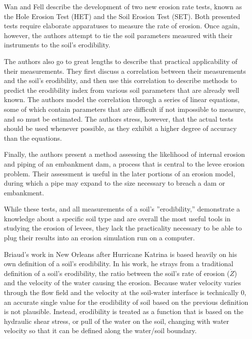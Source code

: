 Wan and Fell \cite{Wan-InvestigationOfErosionRate} describe the development of two new erosion rate tests, known as the Hole Erosion Test (HET) and the Soil Erosion Test (SET). Both presented tests require elaborate apparatuses to measure the rate of erosion. Once again, however, the authors attempt to tie the soil parameters measured with their instruments to the soil's erodibility.

The authors also go to great lengths to describe that practical applicability of their measurements. They first discuss a correlation between their measurements and the soil's erodibility, and then use this correlation to describe methods to predict the erodibility index from various soil parameters that are already well known. The authors model the correlation through a series of linear equations, some of which contain parameters that are difficult if not impossible to measure, and so must be estimated. The authors stress, however, that the actual tests should be used whenever possible, as they exhibit a higher degree of accuracy than the equations.

Finally, the authors present a method assessing the likelihood of internal erosion and piping of an embankment dam, a process that is central to the levee erosion problem. Their assessment is useful in the later portions of an erosion model, during which a pipe may expand to the size necessary to breach a dam or embankment.

While these tests, and all measurements of a soil's ''erodibility,'' demonstrate a knowledge about a specific soil type and are overall the most useful tools in studying the erosion of levees, they lack the practicality necessary to be able to plug their results into an erosion simulation run on a computer. 


Briaud's work in New Orleans after Hurricane Katrina is based heavily on his own definition of a soil's erodibility. In his work, he strays from a traditional definition of a soil's erodibility, the ratio between the soil's rate of erosion ($\dot{Z}$) and the velocity of the water causing the erosion. Because water velocity varies through the flow field and the velocity at the soil-water interface is technically 0, an accurate single value for the erodibility of soil based on the previous definition is not plausible. Instead, erodibility is treated as a function that is based on the hydraulic shear stress, or pull of the water on the soil, changing with water velocity so that it can be defined along the water/soil boundary.

